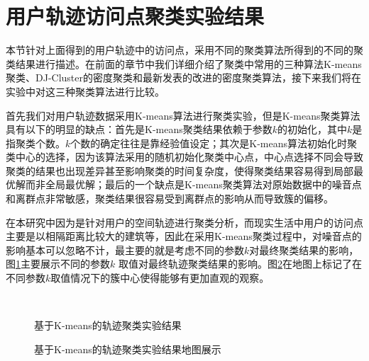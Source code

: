 \section{用户轨迹访问点聚类实验结果}
\label{traclustar}
本节针对上面得到的用户轨迹中的访问点，采用不同的聚类算法所得到的不同的聚类结果进行描述。在前面的章节中我们详细介绍了聚类中常用的三种算法K-means聚类、DJ-Cluster的密度聚类和最新发表的改进的密度聚类算法，接下来我们将在实验中对这三种聚类算法进行比较。
\par 首先我们对用户轨迹数据采用K-means算法进行聚类实验，但是K-means聚类算法具有以下的明显的缺点：首先是K-means聚类结果依赖于参数$k$的初始化，其中$k$是指聚类个数。$k$个数的确定往往是靠经验值设定；其次是K-means算法初始化时聚类中心的选择，因为该算法采用的随机初始化聚类中心点，中心点选择不同会导致聚类的结果也出现差异甚至影响聚类的时间复杂度，使得聚类结果容易得到局部最优解而非全局最优解；最后的一个缺点是K-means聚类算法对原始数据中的噪音点和离群点非常敏感，聚类结果很容易受到离群点的影响从而导致簇的偏移。
\par 在本研究中因为是针对用户的空间轨迹进行聚类分析，而现实生活中用户的访问点主要是以相隔距离比较大的建筑等，因此在采用K-means聚类过程中，对噪音点的影响基本可以忽略不计，最主要的就是考虑不同的参数$k$对最终聚类结果的影响，图\ref{fig:3_8_1}主要展示不同的参数$k$ 取值对最终轨迹聚类结果的影响。图\ref{fig:3_9_1}在地图上标记了在不同参数$k$取值情况下的簇中心使得能够有更加直观的观察。
\begin{figure}[htb]
  \centering%
  \\
  \caption{基于K-means的轨迹聚类实验结果}
  \label{fig:3_8_1}
\end{figure}
\begin{figure}[htb]
  \centering%
  \caption{基于K-means的轨迹聚类实验结果地图展示}
  \label{fig:3_9_1}
\end{figure}

